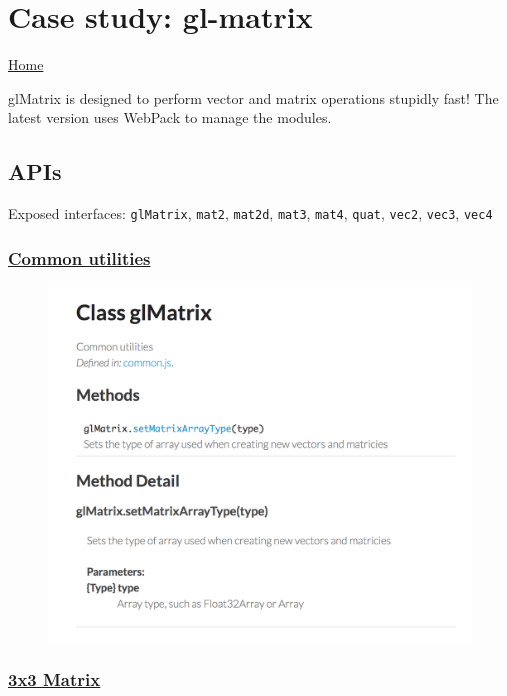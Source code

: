 \section{Case study: gl-matrix}\label{case-study-gl-matrix}

\href{http://glmatrix.net}{Home}

glMatrix is designed to perform vector and matrix operations stupidly
fast! The latest version uses WebPack to manage the modules.

\subsection{APIs}\label{apis}

Exposed interfaces: \texttt{glMatrix}, \texttt{mat2}, \texttt{mat2d},
\texttt{mat3}, \texttt{mat4}, \texttt{quat}, \texttt{vec2},
\texttt{vec3}, \texttt{vec4}

\subsubsection{\texorpdfstring{\href{http://glmatrix.net/docs/2.2.0/symbols/glMatrix.html}{Common
utilities}}{Common utilities}}\label{common-utilities}

\begin{figure}[htbp]
\centering
\includegraphics{gl-matrix.png}
\caption{}
\end{figure}

\subsubsection{\texorpdfstring{\href{http://glmatrix.net/docs/2.2.0/symbols/mat3.html}{3x3
Matrix}}{3x3 Matrix}}\label{x3-matrix}

